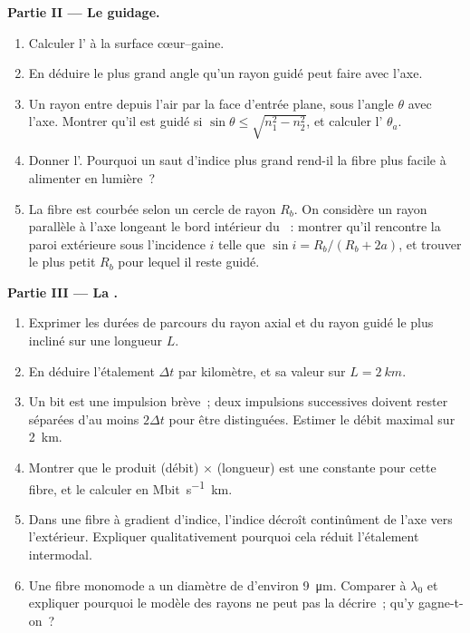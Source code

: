\begin{problem}
\medskip
\noindent\textbf{Partie II --- Le guidage.}
\begin{enumerate}[resume]
  \item Calculer l' à la surface cœur--gaine.
  \item En déduire le plus grand angle qu'un rayon guidé peut faire avec
        l'axe.
  \item Un rayon entre depuis l'air par la face d'entrée plane, sous
        l'angle $\theta$ avec l'axe. Montrer qu'il est guidé si
        $\sin\theta \leq
        \sqrt{n_1^2 - n_2^2}$, et calculer l'
        $\theta_a$.
  \item Donner l'. Pourquoi un saut d'indice plus
        grand rend-il la fibre plus facile à alimenter en lumière~?
  \item La fibre est courbée selon un cercle de rayon $R_b$. On
        considère un rayon parallèle à l'axe longeant le bord intérieur
        du ~: montrer qu'il rencontre la paroi extérieure sous
        l'incidence $i$ telle que $\sin i = R_b/(R_b + 2a)$, et trouver
        le plus petit $R_b$ pour lequel il reste guidé.
\end{enumerate}

\medskip
\noindent\textbf{Partie III --- La .}
\begin{enumerate}[resume]
  \item Exprimer les durées de parcours du rayon axial et du rayon guidé
        le plus incliné sur une longueur $L$.
  \item En déduire l'étalement $\Delta t$ par kilomètre, et sa valeur
        sur $L = \qty{2}{km}$.
  \item Un bit est une impulsion brève~; deux impulsions successives
        doivent rester séparées d'au moins $2\Delta t$ pour être
        distinguées. Estimer le débit maximal sur \qty{2}{km}.
  \item Montrer que le produit (débit) $\times$ (longueur) est une
        constante pour cette fibre, et le calculer en
        \unit{Mbit.s^{-1}.km}.
  \item Dans une fibre à gradient d'indice, l'indice décroît
        continûment de l'axe vers l'extérieur. Expliquer
        qualitativement pourquoi cela réduit l'étalement intermodal.
  \item Une fibre monomode a un diamètre de  d'environ
        \qty{9}{\micro m}. Comparer à $\lambda_0$ et expliquer pourquoi
        le modèle des rayons ne peut pas la décrire~; qu'y gagne-t-on~?
\end{enumerate}


\end{problem}
